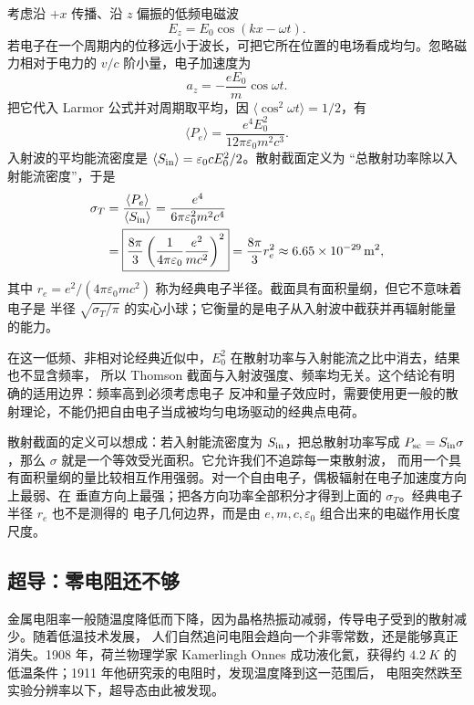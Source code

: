 考虑沿 $+x$ 传播、沿 $z$ 偏振的低频电磁波
\begin{equation}
  E_z=E_0\cos(kx-\omega t).
\end{equation}
若电子在一个周期内的位移远小于波长，可把它所在位置的电场看成均匀。忽略磁力相对于电力的
$v/c$ 阶小量，电子加速度为
\begin{equation}
  a_z=-\frac{eE_0}{m}\cos\omega t.
\end{equation}
把它代入 Larmor 公式并对周期取平均，因 $\langle\cos^2\omega t\rangle=1/2$，有
\begin{equation}
  \langle P_e\rangle=\frac{e^4E_0^2}{12\pi\varepsilon_0m^2c^3}.
\end{equation}
入射波的平均能流密度是 $\langle S_{\rm in}\rangle=\varepsilon_0cE_0^2/2$。散射截面定义为
“总散射功率除以入射能流密度”，于是
\begin{align}
  \sigma_T
  &=\frac{\langle P_e\rangle}{\langle S_{\rm in}\rangle}
  =\frac{e^4}{6\pi\varepsilon_0^2m^2c^4}
  \\
  &=\boxed{\frac{8\pi}{3}\left(\frac{1}{4\pi\varepsilon_0}
  \frac{e^2}{mc^2}\right)^2}
  =\frac{8\pi}{3}r_e^2
  \approx\SI{6.65e-29}{m^2},
\end{align}
其中 $r_e=e^2/(4\pi\varepsilon_0mc^2)$ 称为经典电子半径。截面具有面积量纲，但它不意味着电子是
半径 $\sqrt{\sigma_T/\pi}$ 的实心小球；它衡量的是电子从入射波中截获并再辐射能量的能力。

在这一低频、非相对论经典近似中，$E_0^2$ 在散射功率与入射能流之比中消去，结果也不显含频率，
所以 Thomson 截面与入射波强度、频率均无关。这个结论有明确的适用边界：频率高到必须考虑电子
反冲和量子效应时，需要使用更一般的散射理论，不能仍把自由电子当成被均匀电场驱动的经典点电荷。

散射截面的定义可以想成：若入射能流密度为 $S_{\rm in}$，把总散射功率写成
$P_{\rm sc}=S_{\rm in}\sigma$，那么 $\sigma$ 就是一个等效受光面积。它允许我们不追踪每一束散射波，
而用一个具有面积量纲的量比较相互作用强弱。对一个自由电子，偶极辐射在电子加速度方向上最弱、在
垂直方向上最强；把各方向功率全部积分才得到上面的 $\sigma_T$。经典电子半径 $r_e$ 也不是测得的
电子几何边界，而是由 $e,m,c,\varepsilon_0$ 组合出来的电磁作用长度尺度。

\thomsonScatteringDiagram

\subsection*{超导：零电阻还不够}

金属电阻率一般随温度降低而下降，因为晶格热振动减弱，传导电子受到的散射减少。随着低温技术发展，
人们自然追问电阻会趋向一个非零常数，还是能够真正消失。1908 年，荷兰物理学家 Kamerlingh Onnes
成功液化氦，获得约 $\SI{4.2}{K}$ 的低温条件；1911 年他研究汞的电阻时，发现温度降到这一范围后，
电阻突然跌至实验分辨率以下，超导态由此被发现。

